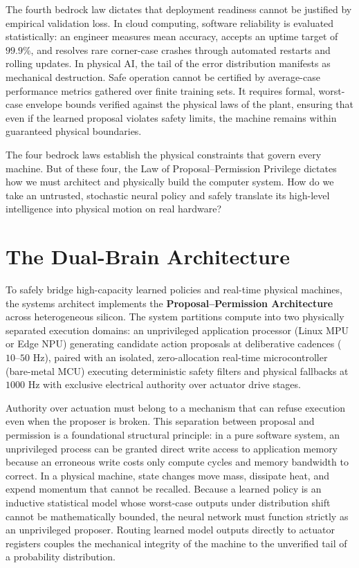 \documentclass[
  10pt,
  letterpaper,
  twoside,
  openright,
  numbers=noenddot,
  headings=standardclasses
]{scrbook}
\begin{document}
The fourth bedrock law dictates that deployment readiness cannot be
justified by empirical validation loss. In cloud computing, software
reliability is evaluated statistically: an engineer measures mean
accuracy, accepts an uptime target of \(99.9\%\), and resolves rare
corner-case crashes through automated restarts and rolling updates. In
physical AI, the tail of the error distribution manifests as mechanical
destruction. Safe operation cannot be certified by average-case
performance metrics gathered over finite training sets. It requires
formal, worst-case envelope bounds verified against the physical laws of
the plant, ensuring that even if the learned proposal violates safety
limits, the machine remains within guaranteed physical boundaries.

The four bedrock laws establish the physical constraints that govern
every machine. But of these four, the Law of Proposal--Permission
Privilege dictates how we must architect and physically build the
computer system. How do we take an untrusted, stochastic neural policy
and safely translate its high-level intelligence into physical motion on
real hardware?

\section{The Dual-Brain Architecture}\label{sec-boundary-1-8}

To safely bridge high-capacity learned policies and real-time physical
machines, the systems architect implements the
\textbf{Proposal--Permission Architecture} across heterogeneous silicon.
The system partitions compute into two physically separated execution
domains: an unprivileged application processor (Linux MPU or Edge NPU)
generating candidate action proposals at deliberative cadences
(\(10\text{--}50\text{ Hz}\)), paired with an isolated, zero-allocation
real-time microcontroller (bare-metal MCU) executing deterministic
safety filters and physical fallbacks at \(1000\text{ Hz}\) with
exclusive electrical authority over actuator drive stages.

Authority over actuation must belong to a mechanism that can refuse
execution even when the proposer is broken. This separation between
proposal and permission is a foundational structural principle: in a
pure software system, an unprivileged process can be granted direct
write access to application memory because an erroneous write costs only
compute cycles and memory bandwidth to correct. In a physical machine,
state changes move mass, dissipate heat, and expend momentum that cannot
be recalled. Because a learned policy is an inductive statistical model
whose worst-case outputs under distribution shift cannot be
mathematically bounded, the neural network must function strictly as an
unprivileged proposer. Routing learned model outputs directly to
actuator registers couples the mechanical integrity of the machine to
the unverified tail of a probability distribution.
\end{document}
